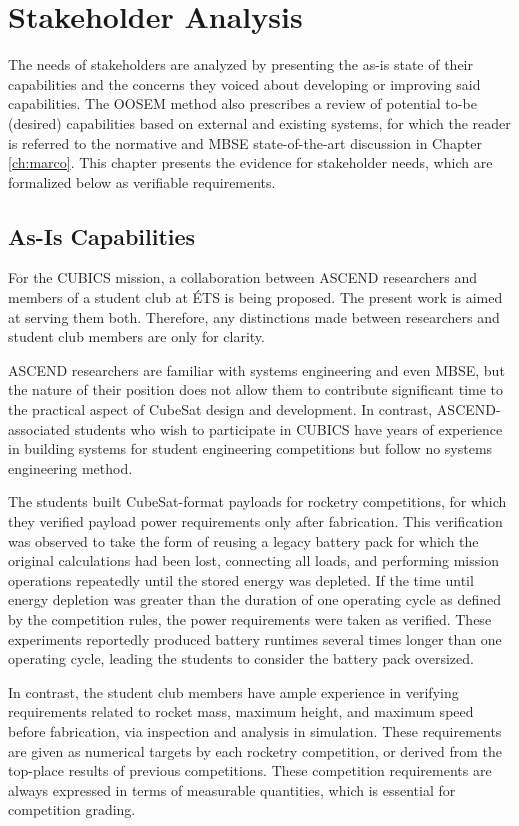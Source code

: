 \section{Stakeholder Analysis}
The needs of stakeholders are analyzed by presenting the as-is state of their capabilities and the concerns they voiced about developing or improving said capabilities.
The OOSEM method also prescribes a review of potential to-be (desired) capabilities based on external and existing systems, for which the reader is referred to the normative and MBSE state-of-the-art discussion in Chapter \ref{ch:marco}.
This chapter presents the evidence for stakeholder needs, which are formalized below as verifiable requirements.

\subsection{As-Is Capabilities}
For the CUBICS mission, a collaboration between ASCEND researchers and members of a student club at ÉTS is being proposed.
The present work is aimed at serving them both.
Therefore, any distinctions made between researchers and student club members are only for clarity.

ASCEND researchers are familiar with systems engineering and even MBSE, but the nature of their position does not allow them to contribute significant time to the practical aspect of CubeSat design and development.
In contrast, ASCEND-associated students who wish to participate in CUBICS have years of experience in building systems for student engineering competitions but follow no systems engineering method.

The students built CubeSat-format payloads for rocketry competitions, for which they verified payload power requirements only after fabrication.
This verification was observed to take the form of reusing a legacy battery pack for which the original calculations had been lost, connecting all loads, and performing mission operations repeatedly until the stored energy was depleted.
If the time until energy depletion was greater than the duration of one operating cycle as defined by the competition rules, the power requirements were taken as verified.
These experiments reportedly produced battery runtimes several times longer than one operating cycle, leading the students to consider the battery pack oversized.

In contrast, the student club members have ample experience in verifying requirements related to rocket mass, maximum height, and maximum speed before fabrication, via inspection and analysis in simulation.
These requirements are given as numerical targets by each rocketry competition, or derived from the top-place results of previous competitions.
These competition requirements are always expressed in terms of measurable quantities, which is essential for competition grading.

